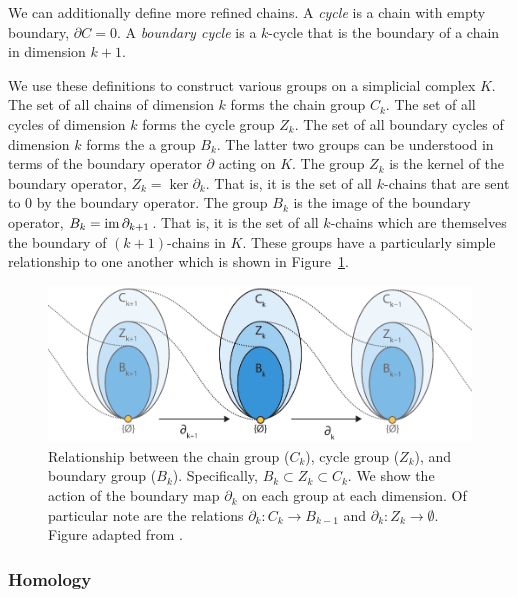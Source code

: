 We can additionally define more refined chains.
A \emph{cycle} is a chain with empty boundary, $\partial C=0$.
A \emph{boundary cycle} is a $k$-cycle that is the boundary of a chain in dimension $k+1$.

We use these definitions to construct various groups on a simplicial complex $K$.
The set of all chains of dimension $k$ forms the chain group $C_{k}$.
The set of all cycles of dimension $k$ forms the cycle group $Z_{k}$.
The set of all boundary cycles of dimension $k$ forms the a group $B_{k}$.
The latter two groups can be understood in terms of the boundary operator $\partial$ acting on $K$.
The group $Z_{k}$ is the kernel of the boundary operator, $Z_{k}=\ker\partial_{k}$.
That is, it is the set of all $k$-chains that are sent to $0$ by the boundary operator.
The group $B_{k}$ is the image of the boundary operator, $B_{k}=\operatorname{im}\partial_{k+1}$.
That is, it is the set of all $k$-chains which are themselves the boundary of $(k+1)$-chains in $K$.
These groups have a particularly simple relationship to one another which is shown in Figure~\ref{fig:bg:chain_complex_maps}.

\begin{figure}
\centering
\includegraphics[]{fig/background/chain_complex_maps.pdf}
\caption[Relationship between the chain group, cycle group, and boundary group]{Relationship between the chain group ($C_k$), cycle group ($Z_k$), and boundary group ($B_k$). Specifically, $B_{k} \subset Z_{k} \subset C_{k}$. We show the action of the boundary map $\partial_k$ on each group at each dimension. Of particular note are the relations $\partial_{k} : C_{k} \rightarrow B_{k-1}$ and $\partial_{k} : Z_{k} \rightarrow \emptyset$. Figure adapted from \cite{Fasy:2014}.}
\label{fig:bg:chain_complex_maps}
\end{figure}

\subsubsection{Homology}
\label{bg:tda:math:homology}

